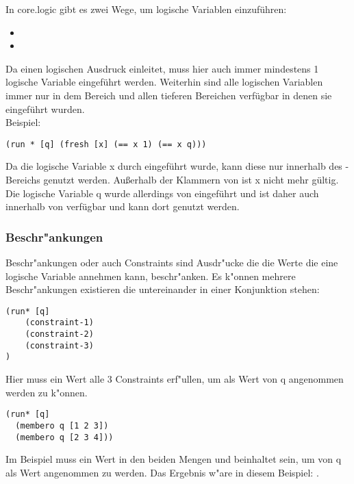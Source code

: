 In core.logic gibt es zwei Wege, um logische Variablen einzuführen:
\begin{itemize}
\item {}
\item {}
\end{itemize}
Da  einen logischen Ausdruck einleitet, muss hier auch immer mindestens 1 logische Variable eingeführt werden. Weiterhin sind alle logischen Variablen immer nur in dem Bereich und allen tieferen Bereichen verfügbar in denen sie eingeführt wurden.\\
Beispiel:
\begin{lstlisting}
(run * [q] (fresh [x] (== x 1) (== x q)))
\end{lstlisting}
Da die logische Variable x durch  eingeführt wurde, kann diese nur innerhalb des -Bereichs genutzt werden. Außerhalb der Klammern von  ist x nicht mehr gültig. Die logische Variable q wurde allerdings von   eingeführt und ist daher auch innerhalb von  verfügbar und kann dort genutzt werden.


\subsubsection{Beschr"ankungen}

Beschr"ankungen oder auch Constraints sind Ausdr"ucke die die Werte die eine logische Variable annehmen kann, beschr"anken. Es k"onnen mehrere Beschr"ankungen existieren die untereinander in einer Konjunktion stehen:
\begin{lstlisting}
(run* [q]
    (constraint-1)
    (constraint-2)
    (constraint-3)
)
\end{lstlisting}
Hier muss ein Wert alle 3 Constraints erf"ullen, um als Wert von q angenommen werden zu k"onnen.
\begin{lstlisting}
(run* [q]
  (membero q [1 2 3])
  (membero q [2 3 4]))
\end{lstlisting}
Im Beispiel muss ein Wert in den beiden Mengen \code{[1 2 3]} und \code{[2 3 4]} beinhaltet sein, um von q als Wert angenommen zu werden. Das Ergebnis w"are in diesem Beispiel: \code{[2 3]}.
